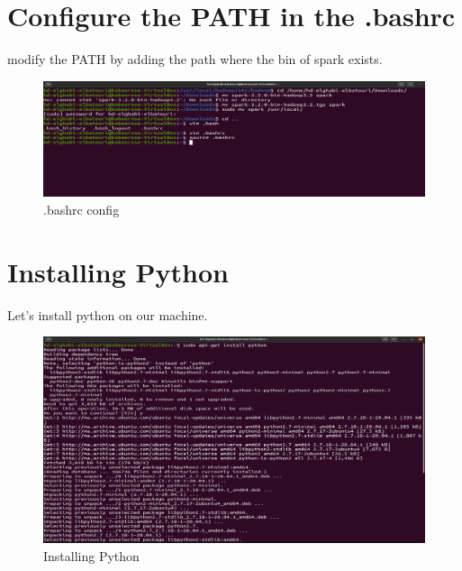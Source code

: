 \begin{spacing}{1.2}
\section{Configure the PATH in the .bashrc}

\par modify the PATH by adding the path where the bin of spark exists.
\\
\begin{figure}[!htb] 
\begin{center} 
\includegraphics[width=1\linewidth]{Big_Data/Spark/Spark Installation & Configuration/.bashrc config} 
\end{center} 
\caption{.bashrc config} 
\end{figure} 
\FloatBarrier

\section{Installing Python}


\par Let's install python on our machine.
\\
\begin{figure}[!htb] 
\begin{center} 
\includegraphics[width=1\linewidth]{Big_Data/Spark/Spark Installation & Configuration/Installing Python} 
\end{center} 
\caption{Installing Python} 
\end{figure} 
\FloatBarrier



\end{spacing}
